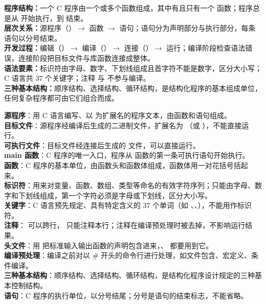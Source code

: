 \documentclass[a4paper,11pt]{article}
\begin{document}

\begin{knowmap}
\textbf{程序结构：}一个 C 程序由一个或多个函数组成，其中有且只有一个  函数；程序总是从  开始执行，到  结束。\\[2pt]
\textbf{层次关系：}源程序（）$\rightarrow$ 函数 $\rightarrow$ 语句；语句分为声明部分与执行部分，每条语句以分号结束。\\[2pt]
\textbf{开发过程：}编辑（）$\rightarrow$ 编译（）$\rightarrow$ 连接（）$\rightarrow$ 运行；编译阶段检查语法错误，连接阶段把目标文件与库函数连接成整体。\\[2pt]
\textbf{语法要素：}标识符由字母、数字、下划线组成且首字符不能是数字，区分大小写；C 语言共 37 个关键字；注释 \code{/* */} 与 \code{//} 不参与编译。\\[2pt]
\textbf{三种基本结构：}顺序结构、选择结构、循环结构，是结构化程序的基本组成单位，任何复杂程序都可由它们组合而成。
\end{knowmap}

\begin{keyterms}
\textbf{源程序}：用 C 语言编写、以  为扩展名的程序文本，由函数和语句组成。\\
\textbf{目标文件}：源程序经编译后生成的二进制文件，扩展名为 （或 ），不能直接运行。\\
\textbf{可执行文件}：目标文件经连接后生成的  文件，可以直接运行。\\
\textbf{main 函数}：C 程序的唯一入口，程序从  函数的第一条可执行语句开始执行。\\
\textbf{函数}：C 程序的基本单位，由函数头和函数体组成，函数体用一对花括号括起来。\\
\textbf{标识符}：用来对变量、函数、数组、类型等命名的有效字符序列；只能由字母、数字和下划线组成，第一个字符必须是字母或下划线，区分大小写。\\
\textbf{关键字}：C 语言预先规定、具有特定含义的 37 个单词（如 、、），不能用作标识符。\\
\textbf{注释}： 可以跨行，\code{//} 只能注释本行；注释在编译预处理时被去掉，不影响运行结果。\\
\textbf{头文件}：用  把标准输入输出函数的声明包含进来，、 都要用到它。\\
\textbf{编译预处理}：编译之前对以 \# 开头的命令行进行处理，如文件包含、宏定义、条件编译。\\
\textbf{三种基本结构}：顺序结构、选择结构、循环结构，是结构化程序设计规定的三种基本控制结构。\\
\textbf{语句}：C 程序的执行单位，以分号结尾；分号是语句的结束标志，不能省略。
\end{keyterms}
\end{document}
